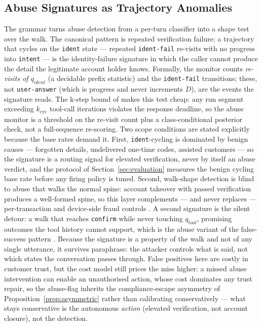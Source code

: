 \subsection{Abuse Signatures as Trajectory Anomalies}
The grammar turns abuse detection from a per-turn classifier into a shape test over the walk.
The canonical pattern is repeated verification failure:
a trajectory that cycles on the \texttt{ident} state --- repeated \texttt{ident-fail} re-visits
with no progress into \texttt{intent} --- is the
identity-failure signature in which the caller cannot produce the detail the legitimate
account holder knows.
Formally, the monitor counts \emph{re-visits of $q_{ident}$} (a decidable prefix statistic) and
the \texttt{ident-fail} transitions; these, not \texttt{user-answer} (which is
progress and never increments $D$), are the events the signature reads.
The k-step bound of \citet{garcia2026latencyfloor} makes this test cheap:
any run segment exceeding $k_{\mathrm{cyc}}$ tool-call iterations violates the response
deadline, so the abuse
monitor is a threshold on the re-visit count plus a class-conditional posterior check, not a
full-sequence re-scoring.
Two scope conditions are stated explicitly because the base rates demand it.
First, \texttt{ident}-cycling is dominated by benign causes --- forgotten details, undelivered
one-time codes, assisted customers --- so the signature is a routing signal for elevated
verification, never by itself an abuse verdict, and the protocol of
Section~\ref{sec:evaluation} measures the benign cycling base rate before any firing policy is
tuned.
Second, walk-shape detection is blind to abuse that walks the normal spine: account takeover
with passed verification produces a well-formed spine, so this
layer complements --- and never replaces --- per-transaction and device-side fraud controls
\citep{falsesuccess2026}.
A second signature is the silent detour: a walk that reaches \texttt{confirm} while never
touching $q_{tool}$, promising outcomes the tool history cannot support, which is the
abuse variant of the false-success pattern \citep{falsesuccess2026}.
Because the signature is a property of the walk and not of any single utterance, it survives
paraphrase: the attacker controls what is said, not which states the conversation passes
through.
False positives here are costly in customer trust, but the cost model still prices the miss
higher: a missed abuse intervention can enable an unauthorised action, whose cost dominates
any trust repair, so the abuse-flag inherits the compliance-escape asymmetry of
Proposition~\ref{prop:asymmetric} rather than calibrating conservatively --- what stays
conservative is the autonomous \emph{action} (elevated verification, not account closure),
not the detection.

